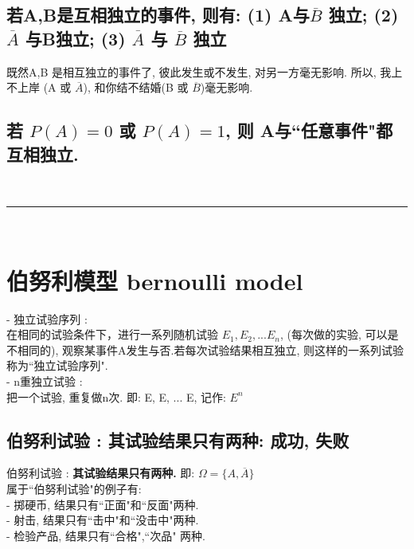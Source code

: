 \documentclass[UTF8]{ctexart}
\begin{document}
		
		
		
		
		\subsection{若A,B是互相独立的事件, 则有: (1) A与$ \overline{B}$ 独立; (2) $ \overline{A}$ 与B独立; (3) $ \overline{A}$ 与 $ \overline{B}$ 独立}
		
		既然A,B 是相互独立的事件了, 彼此发生或不发生, 对另一方毫无影响. 所以, 我上不上岸 (A 或 $\overline{A}$), 和你结不结婚(B 或 $\overline{B}$)毫无影响. 
		
		
		
		\subsection{若 $P(A)=0$ 或 $P(A)=1$, 则 A与``任意事件"都互相独立.}	
		
		
		
		~\\
		\hrule
		~\\
		
	
	\section{伯努利模型 bernoulli model}
	
	- 独立试验序列 :  \\
	在相同的试验条件下，进行一系列随机试验 $ E_1, E_2, ... E_n$, (每次做的实验, 可以是不相同的), 观察某事件A发生与否.若每次试验结果相互独立, 则这样的一系列试验称为``独立试验序列". \\
	
	- n重独立试验 : \\
	把一个试验, 重复做n次. 即:   E, E, ... E, 记作: $ E^n$ \\
	
	
	
	\subsection{伯努利试验 : 其试验结果只有两种: 成功, 失败}
	
	伯努利试验 :  \textbf{其试验结果只有两种.} 即: $ \Omega = \{A, \overline {A}\}$ \\
	
	属于``伯努利试验"的例子有: \\
	- 掷硬币, 结果只有``正面"和``反面"两种. \\
	- 射击, 结果只有``击中"和``没击中"两种.  \\
	- 检验产品, 结果只有``合格",``次品" 两种. \\
	 
\end{document}
